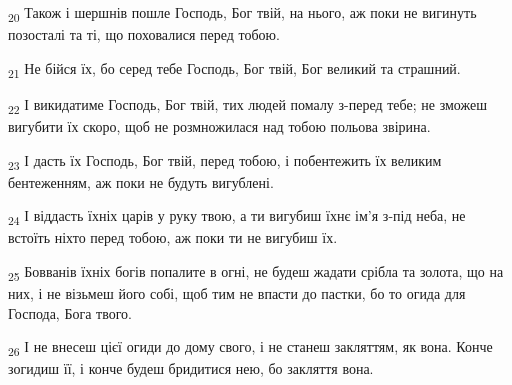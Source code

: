 \begin{tcolorbox}
\textsubscript{20} Також і шершнів пошле Господь, Бог твій, на нього, аж поки не вигинуть позосталі та ті, що поховалися перед тобою.
\end{tcolorbox}
\begin{tcolorbox}
\textsubscript{21} Не бійся їх, бо серед тебе Господь, Бог твій, Бог великий та страшний.
\end{tcolorbox}
\begin{tcolorbox}
\textsubscript{22} І викидатиме Господь, Бог твій, тих людей помалу з-перед тебе; не зможеш вигубити їх скоро, щоб не розмножилася над тобою польова звірина.
\end{tcolorbox}
\begin{tcolorbox}
\textsubscript{23} І дасть їх Господь, Бог твій, перед тобою, і побентежить їх великим бентеженням, аж поки не будуть вигублені.
\end{tcolorbox}
\begin{tcolorbox}
\textsubscript{24} І віддасть їхніх царів у руку твою, а ти вигубиш їхнє ім'я з-під неба, не встоїть ніхто перед тобою, аж поки ти не вигубиш їх.
\end{tcolorbox}
\begin{tcolorbox}
\textsubscript{25} Бовванів їхніх богів попалите в огні, не будеш жадати срібла та золота, що на них, і не візьмеш його собі, щоб тим не впасти до пастки, бо то огида для Господа, Бога твого.
\end{tcolorbox}
\begin{tcolorbox}
\textsubscript{26} І не внесеш цієї огиди до дому свого, і не станеш закляттям, як вона. Конче зогидиш її, і конче будеш бридитися нею, бо закляття вона.
\end{tcolorbox}
